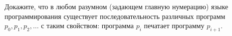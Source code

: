 Докажите, что в любом разумном (задающем главную нумерацию) языке программирования существует последовательность различных
программ $p_0, p_1, p_2, \dots$ с таким свойством: программа $p_i$ печатает программу $p_{i + 1}$. 